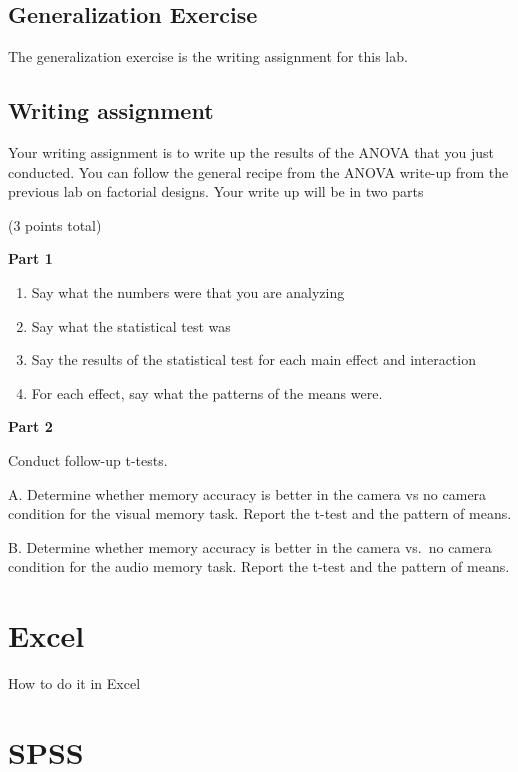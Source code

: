 \documentclass[
]{book}
\providecommand{\tightlist}{%
  \setlength{\itemsep}{0pt}\setlength{\parskip}{0pt}}
\begin{document}
\hypertarget{generalization-exercise-10}{%
\subsection{Generalization Exercise}\label{generalization-exercise-10}}

The generalization exercise is the writing assignment for this lab.

\hypertarget{writing-assignment-9}{%
\subsection{Writing assignment}\label{writing-assignment-9}}

Your writing assignment is to write up the results of the ANOVA that you just conducted. You can follow the general recipe from the ANOVA write-up from the previous lab on factorial designs. Your write up will be in two parts

(3 points total)

\textbf{Part 1}

\begin{enumerate}
\def\labelenumi{\arabic{enumi}.}
\tightlist
\item
  Say what the numbers were that you are analyzing
\item
  Say what the statistical test was
\item
  Say the results of the statistical test for each main effect and interaction
\item
  For each effect, say what the patterns of the means were.
\end{enumerate}

\textbf{Part 2}

Conduct follow-up t-tests.

A. Determine whether memory accuracy is better in the camera vs no camera condition for the visual memory task. Report the t-test and the pattern of means.

B. Determine whether memory accuracy is better in the camera vs.~no camera condition for the audio memory task. Report the t-test and the pattern of means.

\hypertarget{excel-11}{%
\section{Excel}\label{excel-11}}

How to do it in Excel

\hypertarget{spss-11}{%
\section{SPSS}\label{spss-11}}
\end{document}
